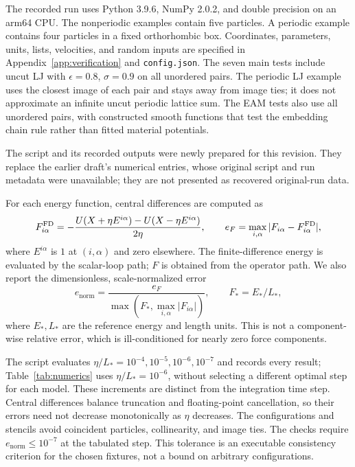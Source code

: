 \documentclass[11pt,a4paper]{article}
\theoremstyle{definition}
\begin{document}
The recorded run uses Python 3.9.6, NumPy 2.0.2, and double precision on an arm64 CPU.
The nonperiodic examples contain five particles. A periodic example contains four particles
in a fixed orthorhombic box. Coordinates, parameters, units, lists, velocities, and random
inputs are specified in Appendix~\ref{app:verification} and \texttt{config.json}.
The seven main tests include uncut LJ with $\epsilon=0.8$, $\sigma=0.9$ on all unordered
pairs. The periodic LJ example uses the closest image of each pair and stays away from image
ties; it does not approximate an infinite uncut periodic lattice sum. The EAM tests also use
all unordered pairs, with constructed smooth functions that test the embedding chain rule
rather than fitted material potentials.

The script and its recorded outputs were newly prepared for this revision. They replace the
earlier draft's numerical entries, whose original script and run metadata were unavailable;
they are not presented as recovered original-run data.

For each energy function, central differences are computed as
\begin{equation}
 F^{\rm FD}_{i\alpha}=-\frac{U(X+\eta E^{i\alpha})-U(X-\eta E^{i\alpha})}{2\eta},\qquad
 e_F=\max_{i,\alpha}|F_{i\alpha}-F^{\rm FD}_{i\alpha}|,
 \label{eq:finite-difference}
\end{equation}
where $E^{i\alpha}$ is $1$ at $(i,\alpha)$ and zero elsewhere. The finite-difference energy
is evaluated by the scalar-loop path; $F$ is obtained from the operator path. We also report
the dimensionless, scale-normalized error
\begin{equation}
e_{\mathrm{norm}}=\frac{e_F}{\max(F_*,\max_{i,\alpha}|F_{i\alpha}|)},\qquad
F_*=E_*/L_*,
\label{eq:normalized-force-error}
\end{equation}
where $E_*,L_*$ are the reference energy and length units. This is not a component-wise
relative error, which is ill-conditioned for nearly zero force components.

The script evaluates $\eta/L_*=10^{-4},10^{-5},10^{-6},10^{-7}$ and records every result;
Table~\ref{tab:numerics} uses $\eta/L_*=10^{-6}$, without selecting a different optimal
step for each model. These increments are distinct from the integration time step.
Central differences balance truncation and floating-point cancellation, so their errors need
not decrease monotonically as $\eta$ decreases. The configurations and stencils avoid
coincident particles, collinearity, and image ties. The checks require
$e_{\mathrm{norm}}\le10^{-7}$ at the tabulated step. This tolerance is an executable
consistency criterion for the chosen fixtures, not a bound on arbitrary configurations.
\end{document}
